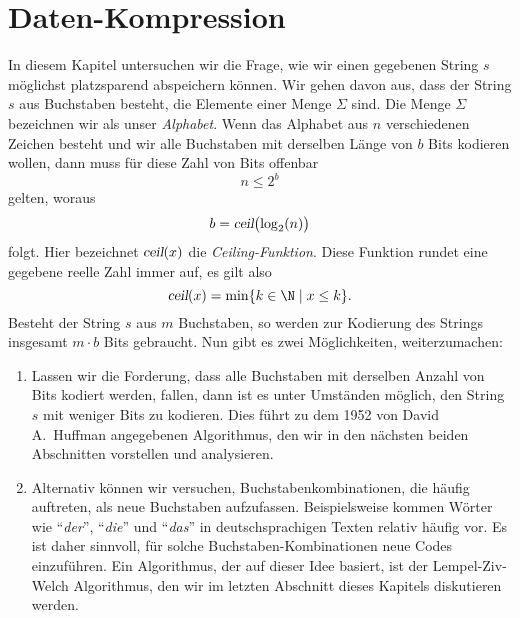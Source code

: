 \chapter{Daten-Kompression}
In diesem Kapitel untersuchen wir die Frage, wie wir einen gegebenen String $s$ m\"oglichst platzsparend
abspeichern k\"onnen.  Wir gehen davon aus, dass der String $s$ aus Buchstaben besteht, die 
Elemente einer Menge $\Sigma$ sind.  Die Menge $\Sigma$ bezeichnen wir als unser \emph{Alphabet}. 
Wenn das Alphabet aus $n$ verschiedenen Zeichen besteht und wir alle Buchstaben mit derselben L\"ange
von $b$ Bits kodieren wollen, dann muss f\"ur diese Zahl von Bits offenbar
\[ n \leq 2^b \] 
gelten, woraus
\[ b = \textsl{ceil}\bigl(\log_2(n)\bigr) \]
folgt.  Hier bezeichnet $\textsl{ceil}(x)$ die \emph{Ceiling-Funktion}.  Diese Funktion
rundet eine gegebene reelle Zahl immer auf, es gilt also
\[ \textsl{ceil}(x) = \min \{ k \in \N \mid x \leq k \}. \]
Besteht der String $s$ aus $m$ Buchstaben, so werden zur Kodierung des Strings insgesamt
$m \cdot b$ Bits gebraucht.  Nun gibt es zwei M\"oglichkeiten, weiterzumachen:
\begin{enumerate}
\item Lassen wir die Forderung, dass alle Buchstaben mit derselben Anzahl von Bits kodiert werden,
      fallen, dann ist es unter Umst\"anden m\"oglich, den String $s$ mit weniger Bits zu kodieren.  
      Dies f\"uhrt zu dem 1952 von David A.~Huffman angegebenen Algorithmus, den wir in den n\"achsten
      beiden Abschnitten vorstellen und analysieren.
\item Alternativ k\"onnen wir versuchen, Buchstabenkombinationen, die h\"aufig auftreten, als neue
      Buchstaben aufzufassen.  Beispielsweise kommen W\"orter wie ``\emph{der}'', ``\emph{die}'' und
      ``\emph{das}'' in deutschsprachigen Texten relativ h\"aufig vor.  Es ist daher sinnvoll, f\"ur
      solche Buchstaben-Kombinationen neue Codes einzuf\"uhren.  Ein Algorithmus, der auf dieser Idee
      basiert, ist der Lempel-Ziv-Welch Algorithmus, den wir im letzten Abschnitt dieses Kapitels 
      diskutieren werden.
\end{enumerate}


